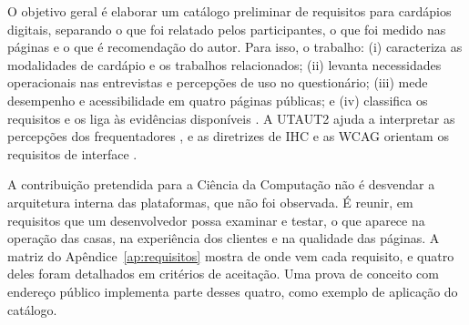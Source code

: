 O objetivo geral é elaborar um catálogo preliminar de requisitos para cardápios digitais, separando o que foi relatado pelos participantes, o que foi medido nas páginas e o que é recomendação do autor. Para isso, o trabalho: (i) caracteriza as modalidades de cardápio e os trabalhos relacionados; (ii) levanta necessidades operacionais nas entrevistas e percepções de uso no questionário; (iii) mede desempenho e acessibilidade em quatro páginas públicas; e (iv) classifica os requisitos e os liga às evidências disponíveis \cite{sommerville2016software,iso25010}. A UTAUT2 ajuda a interpretar as percepções dos frequentadores \cite{venkatesh2012consumer}, e as diretrizes de IHC e as WCAG orientam os requisitos de interface \cite{nielsen1994heuristics,wcag22}.

A contribuição pretendida para a Ciência da Computação não é desvendar a arquitetura interna das plataformas, que não foi observada. É reunir, em requisitos que um desenvolvedor possa examinar e testar, o que aparece na operação das casas, na experiência dos clientes e na qualidade das páginas. A matriz do Apêndice~\ref{ap:requisitos} mostra de onde vem cada requisito, e quatro deles foram detalhados em critérios de aceitação. Uma prova de conceito com endereço público implementa parte desses quatro, como exemplo de aplicação do catálogo.
